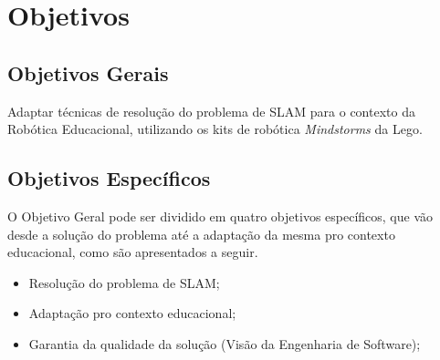 	\section{Objetivos}

	\subsection{Objetivos Gerais} %
	\label{sub:objetivos_gerais}
	
		Adaptar técnicas de resolução do problema de SLAM para o contexto da Robótica Educacional, utilizando os kits de robótica \textit{Mindstorms} da Lego.


	\subsection{Objetivos Específicos} %
	\label{sub:objetivos_específicos}

		O Objetivo Geral pode ser dividido em quatro objetivos específicos, que vão desde a solução do problema até a adaptação da mesma pro contexto educacional, como são apresentados a seguir.
		 
	\begin{itemize}
		\item Resolução do problema de SLAM;
		\item Adaptação pro contexto educacional;
		\item Garantia da qualidade da solução (Visão da Engenharia de Software); 
	\end{itemize}
	
